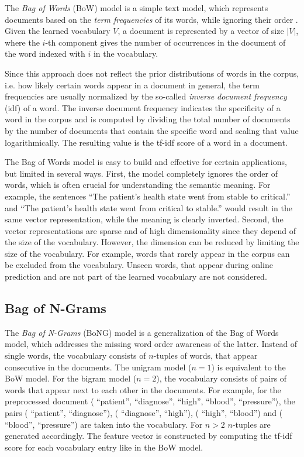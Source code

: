 The \textit{Bag of Words} (BoW) model is a simple text model, which represents documents based on the \textit{term frequencies} of its words, while ignoring their order \cite{harris1954distributional}.
Given the learned vocabulary $V$, a document is represented by a vector of size $|V|$, where the $i$-th component gives the number of occurrences in the document of the word indexed with $i$ in the vocabulary.

Since this approach does not reflect the prior distributions of words in the corpus, i.e. how likely certain words appear in a document in general, the term frequencies are usually normalized by the so-called \textit{inverse document frequency} (idf) of a word.
The inverse document frequency indicates the specificity of a word in the corpus and is computed by dividing the total number of documents by the number of documents that contain the specific word and scaling that value logarithmically.
The resulting value is the tf-idf score of a word in a document.

The Bag of Words model is easy to build and effective for certain applications, but limited in several ways.
First, the model completely ignores the order of words, which is often crucial for understanding the semantic meaning. For example, the sentences  \enquote{The patient's health state went from stable to critical.} and  \enquote{The patient's health state went from critical to stable.} would result in the same vector representation, while the meaning is clearly inverted.
Second, the vector representations are sparse and of high dimensionality since they depend of the size of the vocabulary.
However, the dimension can be reduced by limiting the size of the vocabulary. For example, words that rarely appear in the corpus can be excluded from the vocabulary.
Unseen words, that appear during online prediction and are not part of the learned vocabulary are not considered.

\subsection{Bag of N-Grams}

The \textit{Bag of N-Grams} (BoNG) model is a generalization of the Bag of Words model, which addresses the missing word order awareness of the latter.
Instead of single words, the vocabulary consists of $n$-tuples of words, that appear consecutive in the documents.
The unigram model ($n=1$) is equivalent to the BoW model.
For the bigram model ($n=2$), the vocabulary consists of pairs of words that appear next to each other in the documents.
For example, for the preprocessed document $\langle$ \enquote{patient},  \enquote{diagnose},  \enquote{high},  \enquote{blood},  \enquote{pressure}$\rangle$, the pairs ( \enquote{patient},  \enquote{diagnose}), ( \enquote{diagnose},  \enquote{high}), ( \enquote{high},  \enquote{blood}) and ( \enquote{blood},  \enquote{pressure}) are taken into the vocabulary.
For $n>2$ $n$-tuples are generated accordingly.
The feature vector is constructed by computing the tf-idf score for each vocabulary entry like in the BoW model.

